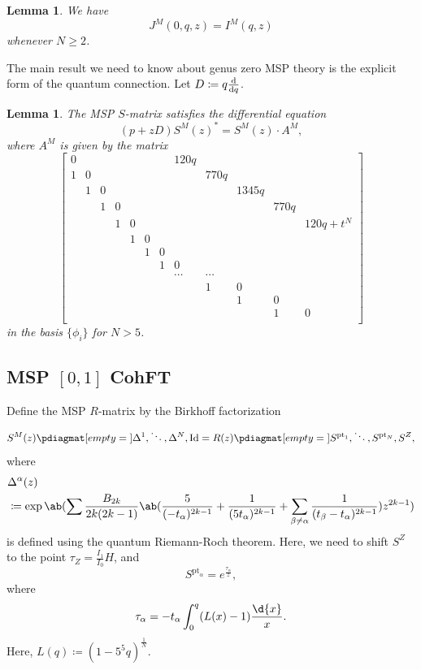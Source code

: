 \documentclass[10pt]{amsart}
\newtheorem{lem}[thm]{Lemma}
\theoremstyle{definition}
\theoremstyle{remark}
\theoremstyle{plain}
\theoremstyle{definition}
\theoremstyle{remark}
\newcommand{\mr}[1]{\mathrm{#1}}
\newcommand{\1}{\mathbf{1}}
\newcommand{\2}{\mathbf{2}}
\newcommand{\3}{\mathbf{3}}
\newcommand{\pt}{\mr{pt}}
\begin{document}
\begin{lem}
    We have
    \[ J^M(0,q,z) = I^M(q,z) \]
    whenever $N \geq 2$.
\end{lem}

The main result we need to know about genus zero MSP theory is the explicit form of the quantum connection. Let $D \coloneqq q \odv{}{q}$.
\begin{lem}
    The MSP $S$-matrix satisfies the differential equation
    \[ (p + zD)S^M(z)^* = S^M(z) \cdot A^M, \]
    where $A^M$ is given by the matrix
    \[ \begin{bmatrix}
        0 & & & & & & &  120 q \\
        1 & 0 & & & & & & & 770 q \\
        & 1 & 0 & & & & & & & 1345 q \\
        & & 1 & 0 & & & & & & & 770 q \\
        & & & 1 & 0 & & & & & & & 120 q + t^N \\
        & & & & 1 & 0 \\
        & & & & & 1 & 0 \\
        & & & & & & 1 & 0 \\
        & & & & & & & \cdots & \cdots \\
        & & & & & & & & 1 & 0 \\
        & & & & & & & & & 1 & 0 \\
        & & & & & & & & & & 1 & 0 \\
    \end{bmatrix}
    \]
    in the basis $\{ \phi_i \}$ for $N > 5$.
\end{lem}

\subsection{MSP $[0,1]$ CohFT}%
\label{sub:MSP 01 CohFT}

Define the MSP $R$-matrix by the Birkhoff factorization
\[ S^M(z) \pdiagmat[empty={}]{\Delta^1,\ddots,\Delta^N,\mr{Id}} = R(z) \pdiagmat[empty={}]{S^{\pt_1},\ddots,S^{\pt_N},S^Z}, \]
where
\begin{align*}
    &\Delta^{\alpha}(z) \\
    &\coloneqq \exp \ab(\sum \frac{B_{2k}}{2k(2k-1)} \ab(\frac{5}{(-t_{\alpha})^{2k-1}} + \frac{1}{( 5t_{\alpha} )^{2k-1}} +\sum_{\beta\neq\alpha} \frac{1}{(t_{\beta}-t_{\alpha})^{2k-1}}) z^{2k-1}) 
\end{align*}
is defined using the quantum Riemann-Roch theorem. Here, we need to shift $S^Z$ to the point $\tau_Z = \frac{I_1}{I_0} H$, and
\[ S^{\pt_{\alpha}} = e^{\frac{\tau_{\alpha}}{z}}, \]
where
\[ \tau_{\alpha} = - t_{\alpha} \int_0^q (L(x)-1) \frac{\d{x}}{x}. \]
Here, $L(q) \coloneqq (1-5^5q)^{\frac{1}{N}}$.
\end{document}
